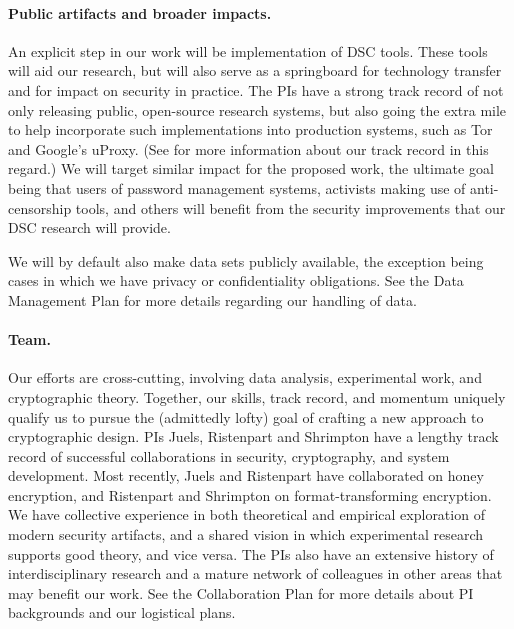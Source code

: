 {\paragraph{Public artifacts and broader impacts.} An explicit step in our work
will be implementation of DSC tools. These tools will aid our research, but will also
serve as a springboard for technology transfer and for impact on
security in practice. The PIs have a strong track record of not only releasing
public, open-source research systems, 
but also going the extra mile to help incorporate such implementations into production
systems, such as Tor and Google's uProxy. 
(See  for more information about our track record in this
regard.)
We will target similar impact for the
proposed work, the ultimate goal being that users of password management systems, 
activists making use of anti-censorship tools, and
others will benefit from the security improvements that our DSC research will provide. 
 

We will by default also make data sets publicly available, the exception being
cases in which we have privacy or confidentiality obligations. See the Data
Management Plan for more details regarding our handling of data.


\paragraph{Team.} Our efforts are cross-cutting, involving data
analysis, experimental work, and cryptographic theory.   Together, our skills, track record, and momentum 
uniquely qualify us to pursue the
(admittedly lofty) goal of crafting a new approach to cryptographic design.
%
PIs Juels, Ristenpart and Shrimpton have a lengthy track record of
successful collaborations in security, cryptography, and system
development.  Most recently, Juels and Ristenpart have collaborated on
honey encryption, and Ristenpart and Shrimpton on format-transforming
encryption.  We have collective experience
in both theoretical and empirical exploration of modern security
artifacts, and a shared vision in which experimental research supports good
theory, and vice versa.  
The PIs also have an extensive history of interdisciplinary research and a mature network of colleagues in other areas that may
benefit our work.
See the Collaboration Plan for more details about PI backgrounds and our logistical plans.

}
